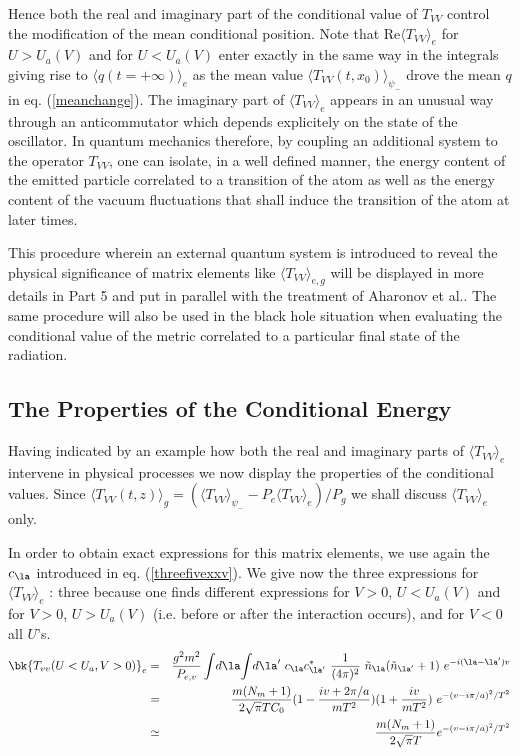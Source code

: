 \documentclass[12pt]{article}
\begin{document}
Hence both the real and imaginary part of the conditional value
  of $T_{VV}$ control the
modification of the mean conditional
position. Note that
Re$\langle T_{VV}\rangle_e$ for $U>U_a(V)$ and for $U<U_a(V)$
enter exactly in the same
way in the integrals giving rise to $\langle q(t=+\infty)
\rangle_e$ as the mean value $\langle T_{VV}(t,x_0)\rangle_{\psi_-}$
drove the mean $q$ in eq. (\ref{meanchange}). The imaginary part
of $\langle T_{VV}\rangle_e$ appears in an unusual way
through an anticommutator which
depends explicitely on the state of the oscillator. In
quantum mechanics therefore, by coupling an additional system
 to the operator $T_{VV}$, one can
isolate, in a well defined manner, the energy content of the emitted particle
correlated
to a transition of the atom as well as the energy content of
the vacuum fluctuations
that shall induce the transition of the atom at  later times.

This
procedure
wherein an external quantum system is introduced to
reveal the physical significance of matrix elements like
$\langle T_{VV}\rangle_{e,g}$ will be displayed in more details in Part 5
and put in parallel with the treatment of Aharonov et al.\cite{aharo}.
The same procedure
will also be used in the black hole situation when evaluating the
conditional value of the metric correlated to
a particular final state of the radiation.

\subsection{The Properties of the Conditional Energy}\label{conded}

Having indicated by an example how both the real and
imaginary parts of $\langle T_{VV}\rangle_e$ intervene in
physical processes we now display the properties of the conditional values.
Since
$\langle T_{VV}(t,z)\rangle_g =
( \langle T_{VV}\rangle_{\psi_-} - P_e \langle T_{VV}\rangle_e )/P_g$
we shall discuss $\langle T_{VV}\rangle_e$ only.

In order to obtain exact expressions for this matrix elements,
we use again the $c_\la$ introduced in eq. (\ref{threefivexxv}).
We give now the
three
expressions for  $\langle T_{VV}\rangle_e$ : three because one finds different
expressions for
$V>0$, $U<U_a(V)$ and for
$V>0$, $U>U_a(V)$ (i.e.   before  or after
the interaction occurs), and for $V<0$ all $U$'s.
\begin{eqnarray}
\bk{T_{vv}(U<U_a, V > 0 )}_{e}
& =&
{ g^2 m^2 \over P_{e,v}}   \int\! d\la \!\int \! d\la^{\prime}\
 c_\la c_{\la^\prime}^{*}\
{1 \over (4 \pi)^2}
\ \tilde n_\la ( \tilde n_{\la^\prime} +1 )\
e^{-i(\la-\la^\prime)v} \nonumber\\
& =&
{m (N_m + 1)\over  2 \sqrt {\pi} T C_0}
 ( 1 - {i v + 2 \pi /a \over m T^2}) ( 1 + {i v \over m T^2})\
e^{ -{ (v-i \pi/a)^2 / T^2}  }
\nonumber\\ &\simeq & { m (N_m +1)\over 2 \sqrt{ \pi} T }
e^{ -{ (v-i \pi/a)^2/
T^2}  }
\label{weeki}\end{eqnarray}
\end{document}
